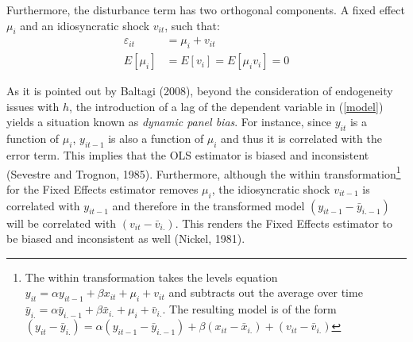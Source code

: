 \documentclass[a4paper, 12pt]{article}
\begin{document}
Furthermore, the disturbance term has two orthogonal components. A fixed effect $\mu _{i}$ and an idiosyncratic shock $v_{it}$, such that:
\begin{equation}
\label{ass_errors}
\begin{aligned}
\varepsilon_{it}&=\mu _{i}+v_{it}\\
E\left[\mu_{i}\right]&=E\left[v_{i}\right]=E\left[\mu_{i}v_i\right]=0
\end{aligned}
\end{equation}

As it is pointed out by Baltagi (2008), beyond the consideration of  endogeneity issues with $h$, the introduction of a lag of the dependent variable in (\ref{model}) yields a situation known as  \emph{dynamic panel bias}. For instance, since $y_{it}$ is a function of $\mu_{i}$, $y_{it-1}$ is also a function of $\mu_{i}$ and thus it is correlated with the error term. This implies that the OLS estimator is biased and inconsistent (Sevestre and Trognon, 1985). Furthermore, although the within transformation\footnote{The within transformation takes the levels equation $y_{it}=\alpha y_{it-1} + \beta x_{it} + \mu_i+v_{it}$ and subtracts out the average over time $\bar y_{i.}=\alpha \bar y_{i.-1} + \beta \bar x_{i.}+\mu_i +\bar v_{i.}$. The resulting model is of the form $(y_{it}-\bar y_{i.})=\alpha (y_{it-1}-\bar y_{i.-1})+ \beta (x_{it}-\bar x_{i.}) +(v_{it}-\bar v_{i.})$} for the Fixed Effects estimator removes $\mu_{i}$, the idiosyncratic shock $v_{it-1}$ is correlated with $y_{it-1}$ and therefore in the transformed model $(y_{it-1}-\bar y_{i.-1})$ will be correlated with $(v_{it}-\bar v_{i.})$. This renders the Fixed Effects estimator to be biased and inconsistent as well (Nickel, 1981).
\end{document}
